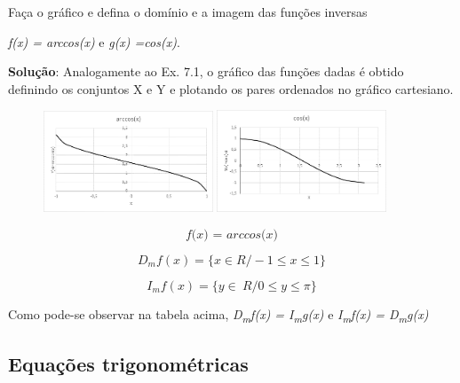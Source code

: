\begin{texemplo}
Faça o gráfico e defina o domínio e a imagem das funções inversas

\textit{f(x) = arccos(x) }e\textit{  g(x) =cos(x)}.

\textbf{Solução}: Analogamente ao Ex. 7.1, o gráfico das funções dadas é obtido definindo os conjuntos X e Y e plotando os pares ordenados no gráfico cartesiano.

\begin{figure}[H]
    \includegraphics[width=0.45\textwidth]{capitulos/trigonometria_e_funcoes_trigonometricas/media/image49.png}

    \includegraphics[width=0.45\textwidth]{capitulos/trigonometria_e_funcoes_trigonometricas/media/image50.png}
\end{figure}

\begin{equation}\tag{gx =cosx.}
\textit{f(x) = arccos(x)}
\end{equation}

\begin{equation}\tag{}
D_{m}f \left( x \right) = \{ x \in  R /-1  \leq x \leq 1 \}
\end{equation}

\begin{equation}\tag{}
I_{m}f \left( x \right) = \{ y \in ~R  / 0  \leq  y  \leq   \pi   \}
\end{equation}

Como pode-se observar na tabela acima, \textit{D\textsubscript{m}f(x) = I\textsubscript{m}g(x)}  e \textit{I\textsubscript{m}f(x) = D\textsubscript{m}g(x)}  \qedsymbol
\end{texemplo}

\subsection{Equações trigonométricas}

